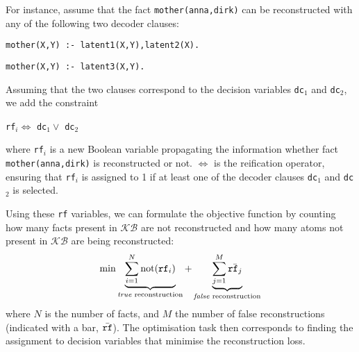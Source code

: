 For instance, assume that the fact \texttt{mother(anna,dirk)} can be reconstructed with any of the following two decoder clauses:
\begin{center}
	\texttt{mother(X,Y) :- latent1(X,Y),latent2(X).}

	 \texttt{mother(X,Y) :- latent3(X,Y).}
\end{center}

Assuming that the two clauses correspond to the decision variables \texttt{dc}$_1$ and \texttt{dc}$_2$, we add the constraint %

\begin{center}
\texttt{rf}$_i \Leftrightarrow$  \texttt{dc}$_1  \vee $ \texttt{dc}$_2$
\end{center}

where \texttt{rf}$_i$ is a new Boolean variable propagating the information whether fact \texttt{mother(anna,dirk)} is reconstructed or not.
$\Leftrightarrow$ is the reification operator, ensuring that \texttt{rf}$_i$ is assigned to 1 if at least one of the decoder clauses \texttt{dc}$_1$ and \texttt{dc}$_2$ is selected.

Using these \texttt{rf} variables, we can formulate the objective function by counting how many facts present in $\mathcal{KB}$ are not reconstructed and how many atoms not present in $\mathcal{KB}$ are being reconstructed:
\begin{equation}
	\min \underbrace{\sum_{i=1}^{N}\text{not}(\text{\texttt{rf}}_i)}_{\text{\textit{true} reconstruction}} +  \underbrace{\sum_{j=1}^{M} \bar{\text{\texttt{rf}}_j}}_{\text{\textit{false} reconstruction}}
\end{equation}
where $N$ is the number of facts, and $M$ the number of false reconstructions (indicated with a bar, $\bar{\text{\texttt{rf}}}$). %
The optimisation task then corresponds to finding the assignment to decision variables that minimise the reconstruction loss.




